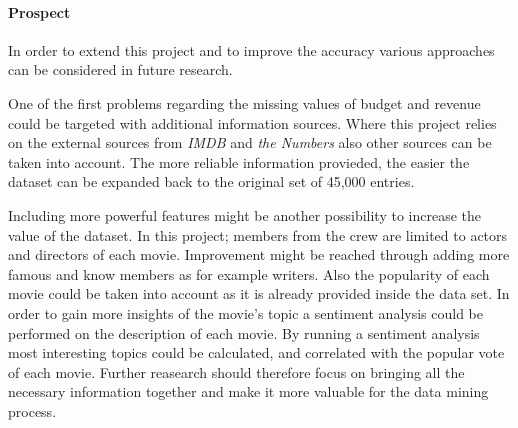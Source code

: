 \paragraph{Prospect}
In order to extend this project and to improve the accuracy various approaches can be considered in future research. 

One of the first problems regarding the missing values of budget and revenue could be targeted with additional information sources. Where this project relies on the external sources from \textit{IMDB } and \textit{the Numbers} also other sources can be taken into account. The more reliable information provieded, the easier the dataset can be expanded back to the original set of 45,000 entries.

\normalsize Including  more powerful features might be another possibility to increase the value of the dataset. In this project; members from the crew are limited to actors and directors of each movie. Improvement might be reached through adding more famous and know members as for example writers. Also the popularity of each movie could be taken into account as it is already provided inside the data set. 
In order to gain more insights of the movie's topic a sentiment analysis could be performed on the description of each movie. By running a sentiment analysis most interesting topics could be calculated, and correlated with the popular vote of each movie. Further reasearch should therefore focus on bringing all the necessary information together and make it more valuable for the data mining process.

%
